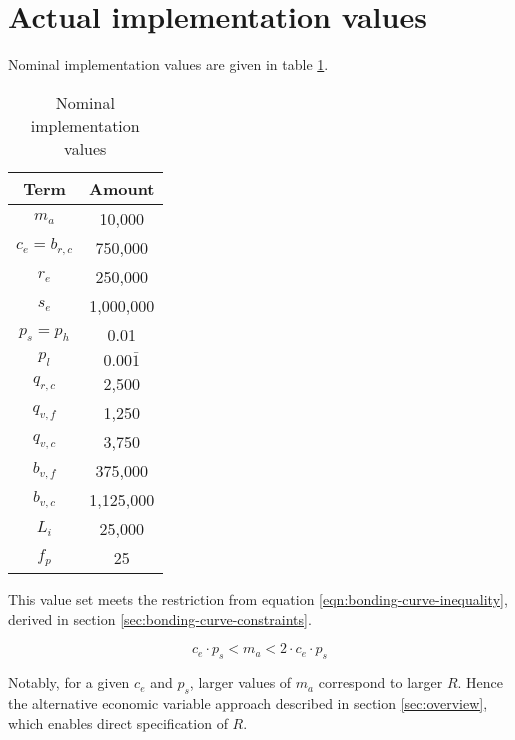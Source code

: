 \documentclass[table, twocolumn]{article}
\begin{document}
\section{Actual implementation values}

Nominal implementation values are given in table
\ref{tab:nominal-implementation-values}.

\begin{table}[!htb]
  \centering
  \begin{tabular}{|c|c|}
    \hline \rowcolor{blue}
    Term            & Amount        \\ \hline
    $m_a$           & 10,000        \\ \hline
    $c_e = b_{r,c}$ & 750,000       \\ \hline
    $r_e$           & 250,000       \\ \hline
    $s_e$           & 1,000,000     \\ \hline
    $p_s = p_h$     & 0.01          \\ \hline
    \rule{0pt}{10pt} %
    $p_l$           & $0.00\bar{1}$ \\ \hline
    $q_{r,c}$       & 2,500         \\ \hline
    $q_{v,f}$       & 1,250         \\ \hline
    $q_{v,c}$       & 3,750         \\ \hline
    $b_{v,f}$       & 375,000       \\ \hline
    $b_{v,c}$       & 1,125,000     \\ \hline
    $L_i$           & 25,000        \\ \hline
    $f_p$           & 25            \\ \hline
  \end{tabular}
  \caption{Nominal implementation values}
  \label{tab:nominal-implementation-values}
\end{table}

This value set meets the restriction from equation \ref{eqn:bonding-curve-inequality},
derived in section \ref{sec:bonding-curve-constraints}.

\begin{equation} \label{eqn:bonding-curve-inequality}
  c_e \cdot p_s < m_a < 2 \cdot c_e \cdot p_s
\end{equation}

Notably, for a given $c_e$ and $p_s$, larger values of $m_a$ correspond to larger $R$.
Hence the alternative economic variable approach described in section
\ref{sec:overview}, which enables direct specification of $R$.
\end{document}
